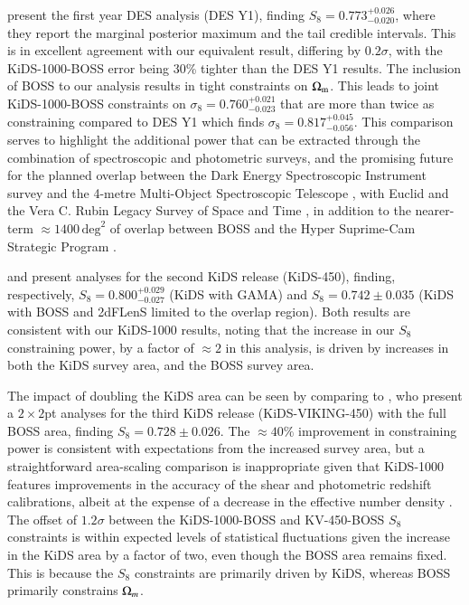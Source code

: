 \citet{abbott/etal:2018} present the first year \tttp DES analysis (DES Y1), finding $S_8=0.773^{+0.026}_{-0.020}$, where they report the marginal posterior maximum and the tail credible intervals.  
This is in excellent agreement with our equivalent result, differing by $0.2\sigma$, with the KiDS-1000-BOSS error being 30\% tighter than the DES Y1 results.  The inclusion of BOSS to our \tttp analysis results in tight constraints on $\Omega_{\rm m}$.  
This leads to joint KiDS-1000-BOSS constraints on $\sigma_8=0.760^{+0.021}_{-0.023}$ that are more than twice as constraining compared to DES Y1 which finds $\sigma_8=0.817^{+0.045}_{-0.056}$. 
This comparison serves to highlight the additional power that can be extracted through the combination of spectroscopic and photometric surveys,  and the promising future for the planned overlap between the Dark Energy Spectroscopic Instrument survey \citep{DESI/etal:2016} and the 4-metre Multi-Object Spectroscopic Telescope \citep[4MOST,][]{guiglion/etal:2019},
with Euclid and the Vera C. Rubin Legacy Survey of Space and Time \citep{laureijs/etal:2011,lsst/etal:2009}, in addition to the nearer-term $\approx\!1400\,\mathrm{deg}^{2}$ of overlap between BOSS and the Hyper Suprime-Cam Strategic Program \citep[HSC,][]{aihara/etal:2019}. 

\citet{vanuitert/etal:2018} and \citet{joudaki/etal:2018} present \tttp analyses for the second KiDS release (KiDS-450), finding, respectively, $S_8 = 0.800_{-0.027}^{+0.029}$ (KiDS with GAMA) and $S_8 = 0.742 \pm 0.035$ (KiDS with BOSS and 2dFLenS limited to the overlap region). 
Both results are consistent with our KiDS-1000 results, noting that the increase in our $S_8$ constraining power, by a factor of $\approx\! 2$ in this analysis, is driven by increases in both the KiDS survey area, and the BOSS survey area.  

The impact of doubling the KiDS area can be seen by comparing to \citet{troester/etal:2020}, who present a $2\times2$pt analyses for the third KiDS release (KiDS-VIKING-450) with the full BOSS area, finding $S_8 = 0.728 \pm 0.026$.   The $\approx\!40\%$ improvement in constraining power is consistent with expectations from the increased survey area, but a straightforward area-scaling comparison is inappropriate given that KiDS-1000 features improvements in the accuracy of the shear and photometric redshift calibrations, albeit at the expense of a decrease in the effective number density \citep[see][for details]{giblin/etal:inprep}.  
The offset of $1.2\sigma$ between the KiDS-1000-BOSS and KV-450-BOSS $S_8$ constraints is within expected levels of statistical fluctuations given the increase in the KiDS area by a factor of two, even though the BOSS area remains fixed.   This is because the $S_8$ constraints are primarily driven by KiDS, whereas BOSS primarily constrains $\Omega_m{\rm}$.















